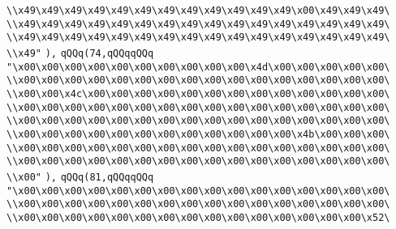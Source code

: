 \verb|\\x49\x49\x49\x49\x49\x49\x49\x49\x49\x49\x49\x49\x00\x49\x49\x49\|\newline
\verb|\\x49\x49\x49\x49\x49\x49\x49\x49\x49\x49\x49\x49\x49\x49\x49\x49\|\newline
\verb|\\x49\x49\x49\x49\x49\x49\x49\x49\x49\x49\x49\x49\x49\x49\x49\x49\|\newline
\verb|\\x49"|\newline
\verb|),|\newline
\verb|qQQq(74,qQQqqQQq|\newline
\verb|"\x00\x00\x00\x00\x00\x00\x00\x00\x00\x00\x4d\x00\x00\x00\x00\x00\|\newline
\verb|\\x00\x00\x00\x00\x00\x00\x00\x00\x00\x00\x00\x00\x00\x00\x00\x00\|\newline
\verb|\\x00\x00\x4c\x00\x00\x00\x00\x00\x00\x00\x00\x00\x00\x00\x00\x00\|\newline
\verb|\\x00\x00\x00\x00\x00\x00\x00\x00\x00\x00\x00\x00\x00\x00\x00\x00\|\newline
\verb|\\x00\x00\x00\x00\x00\x00\x00\x00\x00\x00\x00\x00\x00\x00\x00\x00\|\newline
\verb|\\x00\x00\x00\x00\x00\x00\x00\x00\x00\x00\x00\x00\x4b\x00\x00\x00\|\newline
\verb|\\x00\x00\x00\x00\x00\x00\x00\x00\x00\x00\x00\x00\x00\x00\x00\x00\|\newline
\verb|\\x00\x00\x00\x00\x00\x00\x00\x00\x00\x00\x00\x00\x00\x00\x00\x00\|\newline
\verb|\\x00"|\newline
\verb|),|\newline
\verb|qQQq(81,qQQqqQQq|\newline
\verb|"\x00\x00\x00\x00\x00\x00\x00\x00\x00\x00\x00\x00\x00\x00\x00\x00\|\newline
\verb|\\x00\x00\x00\x00\x00\x00\x00\x00\x00\x00\x00\x00\x00\x00\x00\x00\|\newline
\verb|\\x00\x00\x00\x00\x00\x00\x00\x00\x00\x00\x00\x00\x00\x00\x00\x52\|\newline
